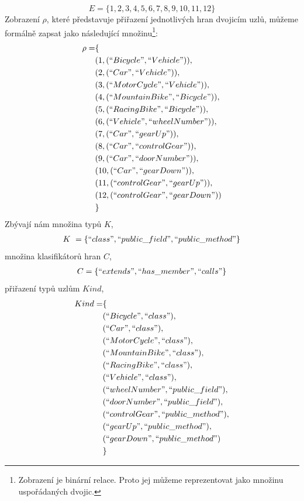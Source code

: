 \begin{displaymath}
  E = \{1, 2, 3, 4, 5, 6, 7, 8, 9, 10, 11, 12\}
\end{displaymath}
Zobrazení $\rho$, které představuje přiřazení jednotlivých hran dvojicím uzlů, můžeme formálně zapsat jako následující množinu\footnote{Zobrazení je binární relace. Proto jej můžeme reprezentovat jako množinu uspořádaných dvojic.}:
\begin{align*}
  \rho = &\{ \\
  &(1, (``Bicycle", ``Vehicle")), \\
  &(2, (``Car", ``Vehicle")), \\
  &(3, (``MotorCycle", ``Vehicle")), \\
  &(4, (``MountainBike", ``Bicycle")), \\
  &(5, (``RacingBike", ``Bicycle")), \\
  &(6, (``Vehicle", ``wheelNumber")), \\
  &(7, (``Car", ``gearUp")), \\
  &(8, (``Car", ``controlGear")), \\
  &(9, (``Car", ``doorNumber")), \\
  &(10, (``Car", ``gearDown")), \\
  &(11, (``controlGear", ``gearUp")), \\
  &(12, (``controlGear", ``gearDown")) \\
  &\}
\end{align*}
Zbývají nám množina typů $K$,
\begin{align*}
  K~= \{ ``class", ``public\_field", ``public\_method" \}
\end{align*}
množina klasifikátorů hran $C$,
\begin{align*}
  C = \{ ``extends", ``has\_member", ``calls" \}
\end{align*}
přiřazení typů uzlům $Kind$,
\begin{align*}
  Kind = &\{ \\
  &(``Bicycle", ``class"), \\
  &(``Car", ``class"), \\
  &(``MotorCycle", ``class"), \\
  &(``MountainBike", ``class"), \\
  &(``RacingBike", ``class"), \\
  &(``Vehicle", ``class"), \\
  &(``wheelNumber", ``public\_field"), \\
  &(``doorNumber", ``public\_field"), \\
  &(``controlGear", ``public\_method"), \\
  &(``gearUp", ``public\_method"), \\
  &(``gearDown", ``public\_method") \\
  &\}
\end{align*}
